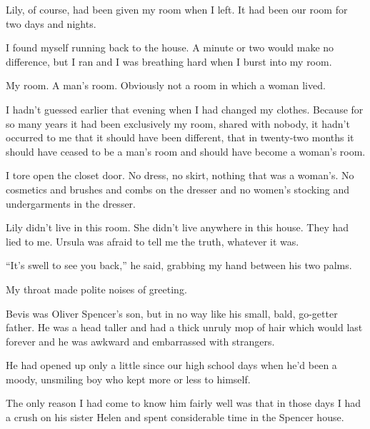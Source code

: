 \documentclass{novel}
\begin{document}
Lily, of course, had been given my room when I left. It had been our room for two days and nights.

I found myself running back to the house. A minute or two would make no difference, but I ran and I was breathing hard when I burst into my room.

My room. A man’s room. Obviously not a room in which a woman lived.

I hadn’t guessed earlier that evening when I had changed my clothes. Because for so many years it had been exclusively my room, shared with nobody, it hadn’t occurred to me that it should have been different, that in twenty-two months it should have ceased to be a man’s room and should have become a woman’s room.

I tore open the closet door. No dress, no skirt, nothing that was a woman’s. No cosmetics and brushes and combs on the dresser and no women’s stocking and undergarments in the dresser.

Lily didn’t live in this room. She didn’t live anywhere in this house. They had lied to me. Ursula was afraid to tell me the truth, whatever it was.

\vspace{2\nbs}
\clearpage
\thispagestyle{empty}
\begin{ChapterStart}
\vspace{3\nbs}
\end{ChapterStart}

“It’s swell to see you back,” he said, grabbing my hand between his two palms.

My throat made polite noises of greeting.

Bevis was Oliver Spencer’s son, but in no way like his small, bald, go-getter father. He was a head taller and had a thick unruly mop of hair which would last forever and he was awkward and embarrassed with strangers. 

He had opened up only a little since our high school days when he’d been a moody, unsmiling boy who kept more or less to himself. 

The only reason I had come to know him fairly well was that in those days I had a crush on his sister Helen and spent considerable time in the Spencer house.
\end{document}
